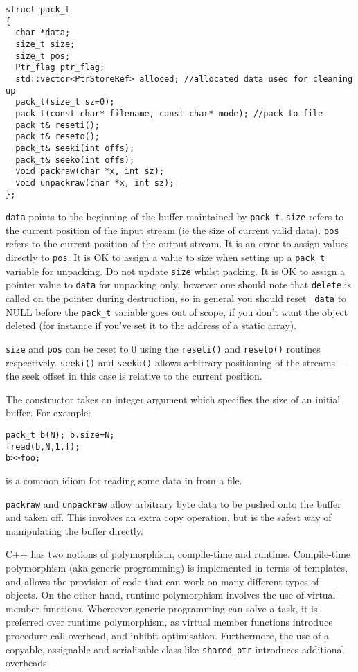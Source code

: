 
\begin{verbatim}
struct pack_t
{
  char *data;
  size_t size;
  size_t pos;
  Ptr_flag ptr_flag;
  std::vector<PtrStoreRef> alloced; //allocated data used for cleaning up 
  pack_t(size_t sz=0);
  pack_t(const char* filename, const char* mode); //pack to file
  pack_t& reseti();
  pack_t& reseto();
  pack_t& seeki(int offs);
  pack_t& seeko(int offs);
  void packraw(char *x, int sz); 
  void unpackraw(char *x, int sz);
};
\end{verbatim}

\verb+data+ points to the beginning of the buffer maintained by
\verb+pack_t+. \verb+size+ refers to the current position of the input
stream (ie the size of current valid data). \verb+pos+ refers to the
current position of the output stream. It is an error to assign values
directly to {\tt pos}. It is OK to assign a value to size when setting
up a \verb+pack_t+ variable for unpacking. Do not update {\tt size}
whilst packing. It is OK to assign a pointer value to {\tt data} for
unpacking only, however one should note that {\tt delete} is called on
the pointer during destruction, so in general you should reset {\tt
data} to NULL before the \verb+pack_t+ variable goes out of scope, if
you don't want the object deleted (for instance if you've set it to
the address of a static array).

{\tt size} and {\tt pos} can be reset to 0 using the {\tt reseti()} and
{\tt reseto()} routines respectively. {\tt seeki()} and {\tt seeko()}
allows arbitrary positioning of the streams --- the seek offset in
this case is relative to the current position.

The constructor takes an integer argument which specifies the size of
an initial buffer. For example:
\begin{verbatim}
pack_t b(N); b.size=N;
fread(b,N,1,f);
b>>foo;
\end{verbatim}
is a common idiom for reading some data in from a file.

\verb+packraw+ and \verb+unpackraw+ allow arbitrary byte data to be
pushed onto the buffer and taken off. This involves an extra copy
operation, but is the safest way of manipulating the buffer directly.

\label{polymorphism}

C++ has two notions of polymorphism, compile-time and runtime.
Compile-time polymorphism (aka generic programming) is implemented in
terms of templates, and allows the provision of code that can work on
many different types of objects. On the other hand, runtime
polymorphism involves the use of virtual member functions. Whereever generic programming can
solve a task, it is preferred over runtime polymorphism, as virtual
member functions introduce procedure call overhead, and inhibit
optimisation. Furthermore, the use of a copyable, assignable and
serialisable class like \verb+shared_ptr+ introduces additional overheads.

